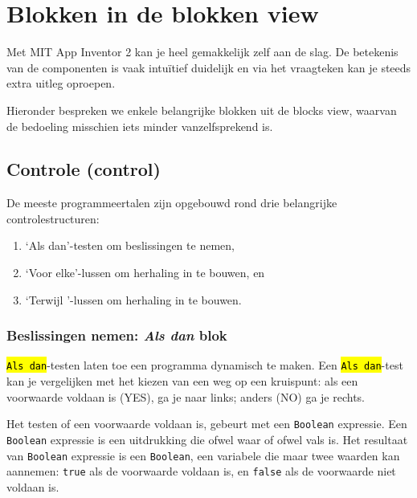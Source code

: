 \section{Blokken in de blokken view}
\label{sec:Mod2_Sec2}
%
Met MIT App Inventor 2 kan je heel gemakkelijk zelf aan de slag. De betekenis van de componenten is vaak intu\"itief duidelijk en via het vraagteken kan je steeds extra uitleg oproepen. 

Hieronder bespreken we enkele belangrijke blokken uit de blocks view, waarvan de bedoeling misschien iets minder vanzelfsprekend is.

\subsection{Controle (control)}
De meeste programmeertalen zijn opgebouwd rond drie belangrijke controlestructuren: 

\begin{enumerate}
	\item \textquoteleft Als dan\textquoteright-testen om beslissingen te nemen, 
	\item \textquoteleft Voor elke\textquoteright-lussen om herhaling in te bouwen, en
	\item  \textquoteleft Terwijl \textquoteright-lussen om herhaling in te bouwen.
\end{enumerate}

\subsubsection{Beslissingen nemen: \emph{Als dan} blok}

\begin{minipage}{.5\linewidth}
\end{minipage}
\begin{minipage}{.5\linewidth}
\end{minipage}

\hl{\texttt{Als dan}}-testen laten toe een programma dynamisch te maken. Een \hl{\texttt{Als dan}}-test kan je vergelijken met het kiezen van een weg op een kruispunt: als een voorwaarde voldaan is (YES), ga je naar links; anders (NO) ga je rechts. 

Het testen of een voorwaarde voldaan is, gebeurt met een \texttt{Boolean} expressie.
Een \texttt{Boolean} expressie is een uitdrukking die ofwel waar of ofwel vals is.
Het resultaat van \texttt{Boolean} expressie is een \texttt{Boolean}, een variabele die maar twee waarden kan aannemen: \texttt{true} als de voorwaarde voldaan is, en \texttt{false} als de voorwaarde niet voldaan is.

